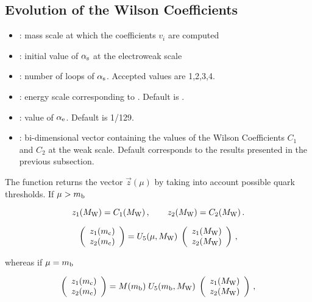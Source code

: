 \subsection{Evolution of the Wilson Coefficients}


\begin{itemize}
\item {}: mass scale at which the coefficients $v_i$ are computed
\item {}: initial value of $\alpha_{\mathrm s}$ at the electroweak scale
\item {}: number of loops of $\alpha_{\mathrm s}$. Accepted values are 1,2,3,4.
\item {}: energy scale corresponding to . Default is .
\item {}: value of $\alpha_{\mathrm e}$. Default is 1/129.
\item {}: bi-dimensional vector containing the values of the Wilson Coefficients $C_1$ and $C_2$ 
at the weak scale. Default corresponds to the results presented in the previous subsection.
\end{itemize}

The function returns the vector $\vec z(\mu)$ by taking into account
possible quark thresholds. If $\mu>m_{\mathrm b}$

\begin{equation}
z_1(M_{\mathrm W}) = C_1(M_{\mathrm W}) \, ,
\qquad
z_2(M_{\mathrm W}) = C_2(M_{\mathrm W}) \, .
\label{eq:zMw12}
\end{equation}

\begin{equation}
\left( \begin{array}{ll} z_1(m_{\mathrm c}) \\ z_2(m_{\mathrm c}) \end{array} \right) =
U_5(\mu,M_{\mathrm W}) \;
\left( \begin{array}{ll} z_1(M_{\mathrm W}) \\ z_2(M_{\mathrm W}) \end{array} \right) \, ,
\label{eq:zmc12}
\end{equation}

whereas if $\mu=m_{\mathrm b}$

\begin{equation}
\left( \begin{array}{ll} z_1(m_{\mathrm c}) \\ z_2(m_{\mathrm c}) \end{array} \right) =
M(m_{\mathrm b}) \; U_5(m_{\mathrm b},M_{\mathrm W}) \;
\left( \begin{array}{ll} z_1(M_{\mathrm W}) \\ z_2(M_{\mathrm W}) \end{array} \right) \, ,
\label{eq:zmc12}
\end{equation}

